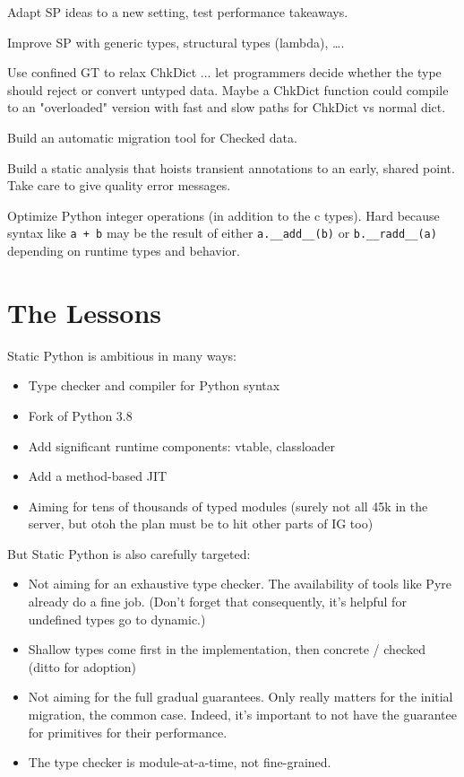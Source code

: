 \documentclass[english,cleveref,submission]{programming}
\newcommand{\SP}{Static Python}
\newcommand{\code}[1]{\texttt{#1}}
\begin{document}
Adapt SP ideas to a new setting, test performance takeaways.

Improve SP with generic types, structural types (lambda), \ldots.

Use confined GT to relax ChkDict ... let programmers decide whether
the type should reject or convert untyped data.
Maybe a ChkDict function could compile to an "overloaded" version with
fast and slow paths for ChkDict vs normal dict.

Build an automatic migration tool for Checked data.

Build a static analysis that hoists transient annotations to an early, shared point.
Take care to give quality error messages.

Optimize Python integer operations (in addition to the c types).
Hard because syntax like \code{a + b} may be the result of either \code{a.\_\_add\_\_(b)}
or \code{b.\_\_radd\_\_(a)} depending on runtime types and behavior.


\section{The Lessons}
\label{s:conclusion}


\SP{} is ambitious in many ways:
\begin{itemize}
  \item Type checker and compiler for Python syntax
  \item Fork of Python 3.8
  \item Add significant runtime components: vtable, classloader
  \item Add a method-based JIT
  \item Aiming for tens of thousands of typed modules (surely not all 45k in the server, but otoh the plan must be to hit other parts of IG too)
\end{itemize}

\noindent{}But \SP{} is also carefully targeted:
\begin{itemize}
  \item
    Not aiming for an exhaustive type checker.
    The availability of tools like Pyre already do a fine job.
    (Don't forget that consequently, it's helpful for undefined types go to dynamic.)
  \item
    Shallow types come first in the implementation, then concrete / checked
    (ditto for adoption)
  \item
    Not aiming for the full gradual guarantees.
    Only really matters for the initial migration, the common case.
    Indeed, it's important to not have the guarantee for primitives for their performance.
  \item
    The type checker is module-at-a-time, not fine-grained.
\end{itemize}
\end{document}
